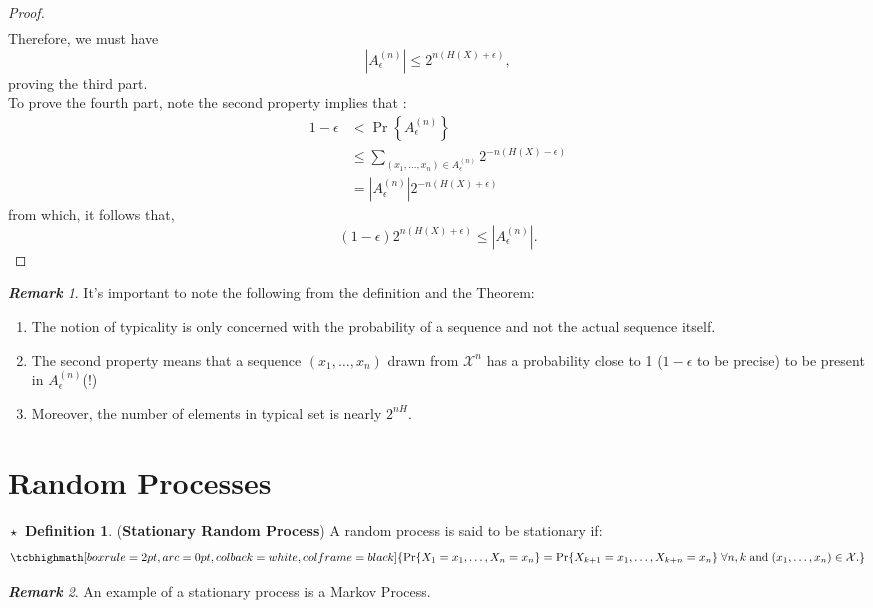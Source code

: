 \documentclass{article}
\theoremstyle{definition}
\newtheorem{definition}{$\boxed{\star}$ Definition}
\theoremstyle{remark}
\newtheorem*{remark}{\textbf{Remark}}
\theoremstyle{definition}
\theoremstyle{definition}
\theoremstyle{definition}
\DeclarePairedDelimiter\abs{\lvert}{\rvert}
\newcommand{\supp}[1]{\mathcal{#1}}
\newcommand{\tset}[2]{A_{#1}^{(#2)}}
\renewcommand{\abs}[1]{\left \vert #1\right \vert}
\newcommand{\defeq}[1]{
		\tcbhighmath[boxrule=2pt,arc=0pt,colback=white,colframe=black]{\begin{aligned}
				#1
		\end{aligned}}
	}
\begin{document}
\begin{proof}
\begin{equation*}
\begin{split}
	\end{split}
\end{equation*}
Therefore, we must have
\[\abs{\tset{\epsilon}{n}} \le 2^{n(H(X)+\epsilon)},\]
proving the third part.\\
To prove the fourth part, note the second property implies that :
\begin{equation*}
	\begin{split}
		1-\epsilon &< \Pr\left \{\tset{\epsilon}{n}\right \}\\
		 &\le \sum_{(x_1,\dots,x_n)\in \tset{\epsilon}{n}}2^{-n(H(X)-\epsilon)}\\
		 &= \abs{\tset{\epsilon}{n}} 2^{-n(H(X)+\epsilon)}
	\end{split}
\end{equation*}
from which, it follows that,
\[(1-\epsilon)2^{n(H(X)+\epsilon)} \le \abs{\tset{\epsilon}{n}}.\]
\end{proof}
\begin{remark}
	It's important to note the following from the definition and the Theorem:
	\begin{enumerate}
		\item {The notion of typicality is only concerned with the probability of a sequence and not the actual sequence itself.}
		\item {The second property means that a sequence $ (x_1,\dots,x_n) $ drawn from $ \supp{X}^n $ has a probability close to 1 ($ 1-\epsilon $ to be precise) to be present in $ \tset{\epsilon}{n} $(!)}
		\item {Moreover, the number of elements in typical set is nearly $ 2^{nH} $.}
	\end{enumerate}
\end{remark}
\hrulefill
\newpage
\section{Random Processes}
\begin{definition}
	(\textbf{Stationary Random Process}) A random process is said to be stationary if:
	\begin{equation}
		\defeq{\Pr\{X_1=x_1,\dots,X_n=x_n\} = \Pr\{X_{k+1} = x_1,\dots, X_{k+n} = x_n\}\;\forall n,k\;\text{and}\;(x_1,\dots,x_n)\in \supp{X}.}
	\end{equation}
\end{definition}
\begin{remark}
	An example of a stationary process is a Markov Process.
\end{remark}
\hrulefill
\end{document}
